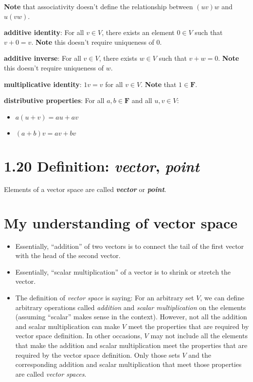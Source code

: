 \documentclass[12pt, letterpaper, oneside]{book}
\begin{document}
\textbf{Note} that associativity doesn't define the relationship between
$(uv)w$ and $u(vw)$.

\textbf{additive identity}: For all $v \in V$, there exists an element $0 \in V$
such that $v + 0 = v$. \textbf{Note} this doesn't require uniqueness of $0$.

\textbf{additive inverse}: For all $v \in V$, there exists $w \in V$ such that
$v + w = 0$. \textbf{Note} this doesn't require uniqueness of $w$.

\textbf{multiplicative identity}: $1v = v$ for all $v \in V$. \textbf{Note}
  that $1 \in \mathbf{F}$.

\textbf{distributive properties}: For all $a, b \in \mathbf{F}$ and all $u, v
\in V$:
\begin{itemize}
  \item $a(u + v) = au + av$
  \item $(a + b)v = av + bv$
\end{itemize}

\section*{1.20 Definition: \textbf{\textit{vector}}, \textbf{\textit{point}}}

Elements of a vector space are called \textbf{\textit{vector}} or
\textbf{\textit{point}}.

\section*{My understanding of vector space}

\begin{itemize}
  \item Essentially, ``addition'' of two vectors is to connect the tail of the
    first vector with the head of the second vector.
  \item Essentially, ``scalar multiplication'' of a vector is to shrink or
    stretch the vector.
  \item The definition of \textit{vector space} is saying: For an arbitrary set
    $V$, we can define arbitrary operations called \textit{addition} and
    \textit{scalar multiplication} on the elements (assuming ``scalar'' makes
    sense in the context). However, not all the addition and scalar
    multiplication can make $V$ meet the properties that are required by vector
    space definition. In other occasions, $V$ may not include all the elements
    that make the addition and scalar multiplication meet the properties that
    are required by the vector space definition. Only those sets $V$ and the
    corresponding addition and scalar multiplication that meet those properties
    are called \textit{vector spaces}.
\end{itemize}
\end{document}
